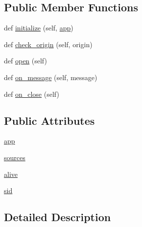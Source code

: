 \subsection*{Public Member Functions}
\begin{DoxyCompactItemize}
\item 
def \hyperlink{classparlai_1_1mturk_1_1webapp_1_1server_1_1TaskSocketHandler_ab4f73b8d0b0a7757d5e038b39b39bae5}{initialize} (self, \hyperlink{classparlai_1_1mturk_1_1webapp_1_1server_1_1TaskSocketHandler_a1e04549bbc02ca8d76b295ea2cb74a0f}{app})
\item 
def \hyperlink{classparlai_1_1mturk_1_1webapp_1_1server_1_1TaskSocketHandler_a70122a05efc4aef04aa4ecb4bd718173}{check\+\_\+origin} (self, origin)
\item 
def \hyperlink{classparlai_1_1mturk_1_1webapp_1_1server_1_1TaskSocketHandler_adb3510933e76ec5d4f7ac2d1dd52962f}{open} (self)
\item 
def \hyperlink{classparlai_1_1mturk_1_1webapp_1_1server_1_1TaskSocketHandler_a5d4b5ce22544ee8eab0063586b9e5fe8}{on\+\_\+message} (self, message)
\item 
def \hyperlink{classparlai_1_1mturk_1_1webapp_1_1server_1_1TaskSocketHandler_a9bf75a90b26ccfe8ba72a5cea8612035}{on\+\_\+close} (self)
\end{DoxyCompactItemize}
\subsection*{Public Attributes}
\begin{DoxyCompactItemize}
\item 
\hyperlink{classparlai_1_1mturk_1_1webapp_1_1server_1_1TaskSocketHandler_a1e04549bbc02ca8d76b295ea2cb74a0f}{app}
\item 
\hyperlink{classparlai_1_1mturk_1_1webapp_1_1server_1_1TaskSocketHandler_a996b255bda95ff104f6117a02874e219}{sources}
\item 
\hyperlink{classparlai_1_1mturk_1_1webapp_1_1server_1_1TaskSocketHandler_a730b42ceee91d8ce1278f60c65595a71}{alive}
\item 
\hyperlink{classparlai_1_1mturk_1_1webapp_1_1server_1_1TaskSocketHandler_a9bdd78d8eed7be817fa1e4aac0b318e7}{sid}
\end{DoxyCompactItemize}


\subsection{Detailed Description}


